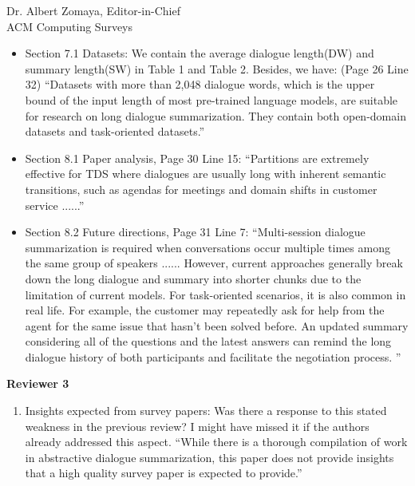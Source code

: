 \documentclass[11pt]{letter} %
\begin{document}
\begin{letter}{
Dr. Albert Zomaya, Editor-in-Chief  \\
ACM Computing Surveys}
\begin{enumerate}
\begin{itemize}
			\item Section 7.1 Datasets: We contain the average dialogue length(DW) and summary length(SW) in Table 1 and Table 2. Besides, we have: (Page 26 Line 32) ``Datasets with more than 2,048 dialogue words, which is the upper bound of the input length of most pre-trained language models, are suitable for research on long dialogue summarization. They contain both open-domain datasets and task-oriented datasets.'' 
			\item Section 8.1 Paper analysis, Page 30 Line 15: ``Partitions are extremely effective for TDS where dialogues are usually long with inherent semantic transitions, such as agendas for meetings and domain shifts in customer service ......''
			\item Section 8.2 Future directions, Page 31 Line 7: ``Multi-session dialogue summarization is required when conversations occur multiple times among the same group of speakers ...... However, current approaches generally break down the long dialogue and summary into shorter chunks due to the limitation of current models. For task-oriented scenarios, it is also common in real life. For example, the customer may repeatedly ask for help from the agent for the same issue that hasn’t been solved before. An updated summary considering all of the questions and the latest answers can remind the long dialogue history of both participants and facilitate the negotiation process. ''	
		\end{itemize}
		 
\end{enumerate}


\textbf{Reviewer 3}
\begin{enumerate}
	\item Insights expected from survey papers: Was there a response to this stated weakness in the previous review? I might have missed it if the authors already addressed this aspect. “While there is a thorough compilation of work in abstractive dialogue summarization, this paper does not provide insights that a high quality survey paper is expected to provide.”


\end{enumerate}
\end{letter}
\end{document}
